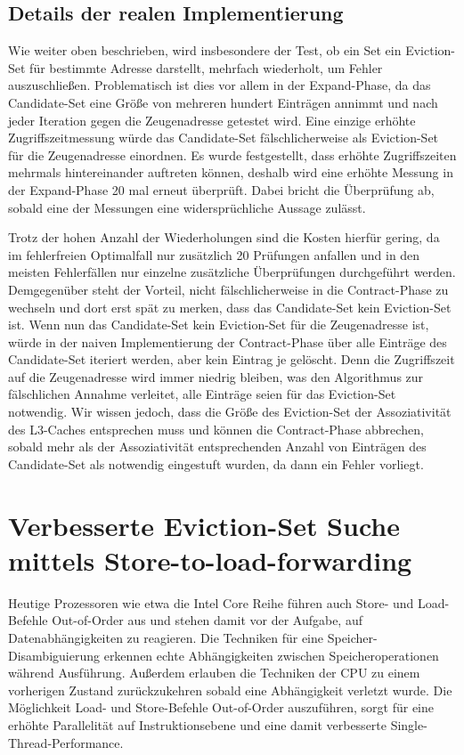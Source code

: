 \subsection{Details der realen Implementierung}

Wie weiter oben beschrieben, wird insbesondere der Test, ob ein Set ein Eviction-Set für bestimmte
Adresse darstellt, mehrfach wiederholt, um Fehler auszuschließen. Problematisch ist dies vor allem in der Expand-Phase, da das Candidate-Set eine Größe von mehreren hundert Einträgen annimmt und nach jeder Iteration gegen die Zeugenadresse getestet wird. 
Eine einzige erhöhte Zugriffszeitmessung würde das Candidate-Set fälschlicherweise als Eviction-Set für die Zeugenadresse einordnen. 
Es wurde festgestellt, dass erhöhte Zugriffszeiten mehrmals hintereinander auftreten können, deshalb wird eine erhöhte Messung in der Expand-Phase 20 mal erneut überprüft. 
Dabei bricht die Überprüfung ab, sobald eine der Messungen eine widersprüchliche Aussage zulässt.

Trotz der hohen Anzahl der Wiederholungen sind die Kosten hierfür gering, da im fehlerfreien Optimalfall nur zusätzlich 20 Prüfungen anfallen und in den meisten Fehlerfällen nur einzelne zusätzliche Überprüfungen durchgeführt werden. 
Demgegenüber steht der Vorteil, nicht fälschlicherweise in die Contract-Phase zu wechseln und dort erst spät zu merken, dass das Candidate-Set kein Eviction-Set ist.
Wenn nun das Candidate-Set kein Eviction-Set für die Zeugenadresse ist, würde in der naiven Implementierung der Contract-Phase über alle Einträge des Candidate-Set iteriert werden, aber kein Eintrag je gelöscht.
Denn die Zugriffszeit auf die Zeugenadresse wird immer niedrig bleiben, was den Algorithmus zur fälschlichen Annahme verleitet, alle Einträge seien für das Eviction-Set notwendig.
Wir wissen jedoch, dass die Größe des Eviction-Set der Assoziativität des L3-Caches entsprechen muss und können die Contract-Phase abbrechen, sobald mehr als der Assoziativität entsprechenden Anzahl von Einträgen des Candidate-Set als notwendig eingestuft wurden, da dann ein Fehler vorliegt.


\section{Verbesserte Eviction-Set Suche mittels Store-to-load-forwarding}

Heutige Prozessoren wie etwa die Intel Core Reihe führen auch Store- und Load-Befehle Out-of-Order aus und stehen damit vor der Aufgabe, auf Datenabhängigkeiten zu reagieren.
Die Techniken für eine Speicher-Disambiguierung erkennen echte Abhängigkeiten zwischen Speicheroperationen während Ausführung. 
Außerdem erlauben die Techniken der CPU zu einem vorherigen Zustand zurückzukehren sobald eine Abhängigkeit verletzt wurde.
Die Möglichkeit Load- und Store-Befehle Out-of-Order auszuführen, sorgt für eine erhöhte Parallelität auf Instruktionsebene und eine damit verbesserte Single-Thread-Performance.

